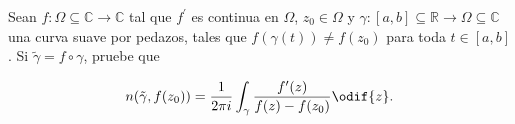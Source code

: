 \documentclass[../main.tex]{subfiles}
\begin{document}
\begin{problema}
    Sean \(f \colon \Omega \subseteq \mathbb{C} \to \mathbb{C}\) tal que
    \(f^{\prime}\) es continua en \(\Omega\), \(z_{0}\in \Omega\) y \(\gamma \colon
    [a, b] \subseteq \mathbb{R} \to \Omega \subseteq \mathbb{C}\) una curva suave por
    pedazos, tales que \(f(\gamma(t)) \neq f(z_{0})\) para toda \(t\in [a, b]\). Si
    \(\tilde{\gamma} = f \circ \gamma\), pruebe que

    \begin{equation*}
        n(\tilde{\gamma}, f(z_{0})) = \dfrac{1}{2\pi
        i}\int_{\gamma}^{}\dfrac{f^{\prime}(z)}{f(z) - f(z_{0})}\odif{z}.
    \end{equation*}
\end{problema}
\end{document}
